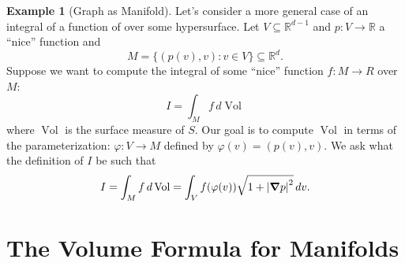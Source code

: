 \documentclass{article}
\theoremstyle{definition}
\newtheorem{exmp}{Example}[section]
\newcommand{\R}{\mathbb{R}}
\theoremstyle{theorem}
\newcommand{\Vol}{\operatorname{Vol}}
\begin{document}
\begin{exmp}[Graph as Manifold]
Let's consider a more general case of an integral of a function of over some hypersurface. Let $V \subseteq \R^{d-1}$ and $p: V \to \R$ a ``nice'' function and 
\begin{equation*}
    M = \{ (p(v),v) : v \in V \} \subseteq \R^d.
\end{equation*}
Suppose we want to compute the integral of some ``nice'' function $f : M \to R$ over $M$:
\begin{equation*}
    I = \int_M f\,d\Vol
\end{equation*}
where $\Vol$ is the surface measure of $S$. Our goal is to compute $\Vol$ in terms of the parameterization: $\varphi: V \to M $ defined by $\varphi(v) = (p(v), v)$. 
We ask what the definition of $I$ be such that 
\begin{equation*}
    I = \int_M f\,d\Vol = \int_V f(\varphi(v)) \sqrt{1+ \abs{\grad p}^2}\,dv. 
\end{equation*}
\end{exmp}







\section{The Volume Formula for Manifolds}
\end{document}
